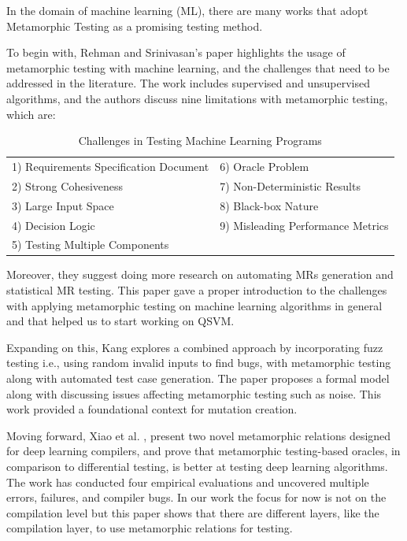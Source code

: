 \documentclass[12pt,a4paper]{article}
\begin{document}
	In the domain of machine learning (ML), there are many works that adopt Metamorphic Testing as a promising testing method. 
	
	To begin with, Rehman and Srinivasan's \cite{frehman2023} paper highlights the usage of metamorphic testing with machine learning, and the challenges that need to be addressed in the literature. The work includes supervised and unsupervised algorithms, and the authors discuss nine limitations with metamorphic testing, which are:
	
	\begin{table}[h!]
		\centering
		\caption{Challenges in Testing Machine Learning Programs}
		\label{tab:my_items_two_col}
		\begin{tabular}{ll}
			\toprule
			1) Requirements Specification Document & 6) Oracle Problem \\
			2) Strong Cohesiveness & 7) Non-Deterministic Results \\
			3) Large Input Space & 8) Black-box Nature \\
			4) Decision Logic & 9) Misleading Performance Metrics \\
			5) Testing Multiple Components & \\
			\bottomrule
		\end{tabular}
	\end{table}
	
	Moreover, they suggest doing more research on automating MRs generation and statistical MR testing. This paper gave a proper introduction to the challenges with applying metamorphic testing on machine learning algorithms in general and that helped us to start working on QSVM. 
	
	Expanding on this, Kang \cite{dkang2022} explores a combined approach by incorporating fuzz testing i.e., using random invalid inputs to find bugs, with metamorphic testing along with automated test case generation. The paper proposes a formal model along with discussing issues affecting metamorphic testing such as noise. This work provided a foundational context for mutation creation.
	
	Moving forward, Xiao et al. \cite{dciao2022}, present two novel metamorphic relations designed for deep learning compilers, and prove that metamorphic testing-based oracles, in comparison to differential testing, is better at testing deep learning algorithms. The work has conducted four empirical evaluations and uncovered multiple errors, failures, and compiler bugs. In our work the focus for now is not on the compilation level but this paper shows that there are different layers, like the compilation layer, to use metamorphic relations for testing.  
	
\end{document}
